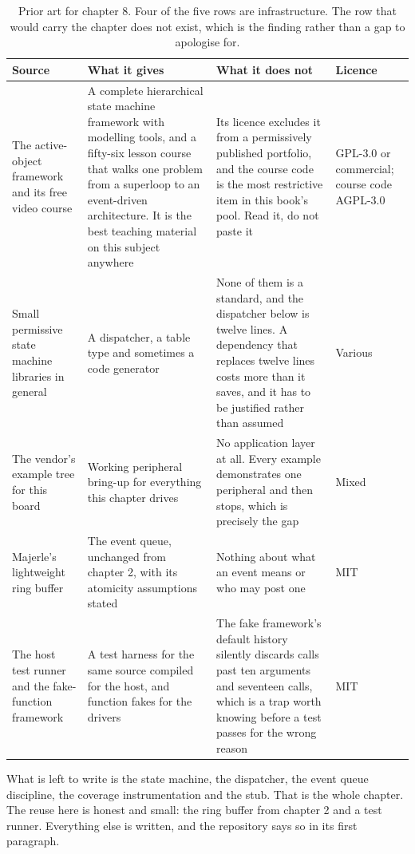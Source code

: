 \begin{table}[H]\centering\small
\begin{tabular}{p{32mm}p{46mm}p{40mm}p{20mm}}
\toprule
Source & What it gives & What it does not & Licence \\
\midrule
The active-object framework and its free video course & A complete hierarchical state machine framework with modelling tools, and a fifty-six lesson course that walks one problem from a superloop to an event-driven architecture. It is the best teaching material on this subject anywhere & Its licence excludes it from a permissively published portfolio, and the course code is the most restrictive item in this book's pool. Read it, do not paste it & GPL-3.0 or commercial; course code AGPL-3.0 \\
Small permissive state machine libraries in general & A dispatcher, a table type and sometimes a code generator & None of them is a standard, and the dispatcher below is twelve lines. A dependency that replaces twelve lines costs more than it saves, and it has to be justified rather than assumed & Various \\
The vendor's example tree for this board & Working peripheral bring-up for everything this chapter drives & No application layer at all. Every example demonstrates one peripheral and then stops, which is precisely the gap & Mixed \\
Majerle's lightweight ring buffer & The event queue, unchanged from chapter 2, with its atomicity assumptions stated & Nothing about what an event means or who may post one & MIT \\
The host test runner and the fake-function framework & A test harness for the same source compiled for the host, and function fakes for the drivers & The fake framework's default history silently discards calls past ten arguments and seventeen calls, which is a trap worth knowing before a test passes for the wrong reason & MIT \\
\bottomrule
\end{tabular}
\caption{Prior art for chapter 8. Four of the five rows are infrastructure. The row that would carry the chapter does not exist, which is the finding rather than a gap to apologise for.}
\end{table}

What is left to write is the state machine, the dispatcher, the event queue
discipline, the coverage instrumentation and the stub. That is the whole
chapter. The reuse here is honest and small: the ring buffer from chapter 2 and
a test runner. Everything else is written, and the repository says so in its
first paragraph.

